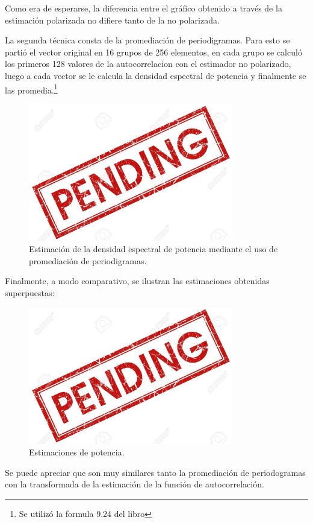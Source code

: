 Como era de esperarse, la diferencia entre el gráfico obtenido a través de la estimación polarizada no difiere tanto de la no polarizada.

La segunda técnica consta de la promediación de periodigramas. Para esto se partió el vector original en 16 grupos de 256 elementos, en cada grupo se calculó los primeros 128 valores de la autocorrelacion con el estimador no polarizado, luego a cada vector se le calcula la densidad espectral de potencia y finalmente se las promedia.\footnote{Se utilizó la formula 9.24 del libro}
\begin{figure}[H]
\centering
	\includegraphics[width=0.8\textwidth, trim = {0 0 0 0},clip]{./Imagenes/pend.jpg}
	\caption{Estimación de la densidad espectral de potencia mediante el uso de promediación de periodigramas.}
	\label{fig:fft-calc}
\end{figure}

Finalmente, a modo comparativo, se ilustran las estimaciones obtenidas superpuestas:
\begin{figure}[H]
\centering
	\includegraphics[width=0.8\textwidth, trim = {0 0 0 0},clip]{./Imagenes/pend.jpg}
	\caption{Estimaciones de potencia.}
	\label{fig:fft2}
\end{figure}
Se puede apreciar que son muy similares tanto la promediación de periodogramas con la transformada de la estimación de la función de autocorrelación.

